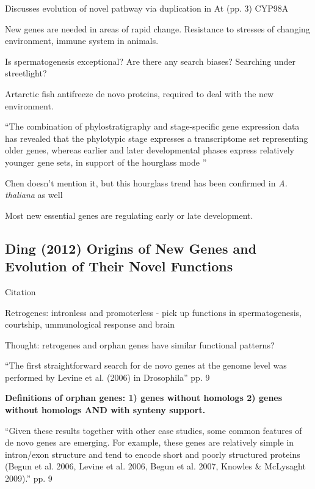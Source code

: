     Discusses evolution of novel pathway via duplication in At (pp. 3)
    CYP98A

    New genes are needed in areas of rapid change. Resistance to stresses
    of changing environment, immune system in animals.

    Is spermatogenesis exceptional? Are there any search biases? Searching
    under streetlight?

    Artarctic fish antifreeze de novo proteins, required to deal with the
    new environment.

    ``The combination of phylostratigraphy and stage-specific gene
    expression data has revealed that the phylotypic stage expresses a
    transcriptome set representing older genes, whereas earlier and later
    developmental phases express relatively younger gene sets, in support
    of the hourglass mode \cite{kalinka_gene_2010,
    domazet-loso_phylogenetically_2010}''

    Chen doesn't mention it, but this hourglass trend has been confirmed in
    \textit{A. thaliana} as well \cite{quint_transcriptomic_2012}

    Most new essential genes are regulating early or late development.

\subsection{Ding (2012) Origins of New Genes and Evolution of Their Novel
Functions}

    Citation \cite{ding_origins_2012}
    
    Retrogenes: intronless and promoterless - pick up functions in
    spermatogenesis, courtship, ummunological response and brain

    Thought: retrogenes and orphan genes have similar functional patterns?

    ``The first straightforward search for de novo genes at the genome
    level was performed by Levine et al. (2006) in Drosophila'' pp. 9

    \textbf{Definitions of orphan genes: 1) genes without homologs 2) genes
    without homologs AND with synteny support.}

    ``Given these results together with other case studies, some common
    features of de novo genes are emerging. For example, these genes are
    relatively simple in intron/exon structure and tend to encode short and
    poorly structured proteins (Begun et al. 2006, Levine et al. 2006,
    Begun et al. 2007, Knowles \& McLysaght 2009).'' pp. 9

